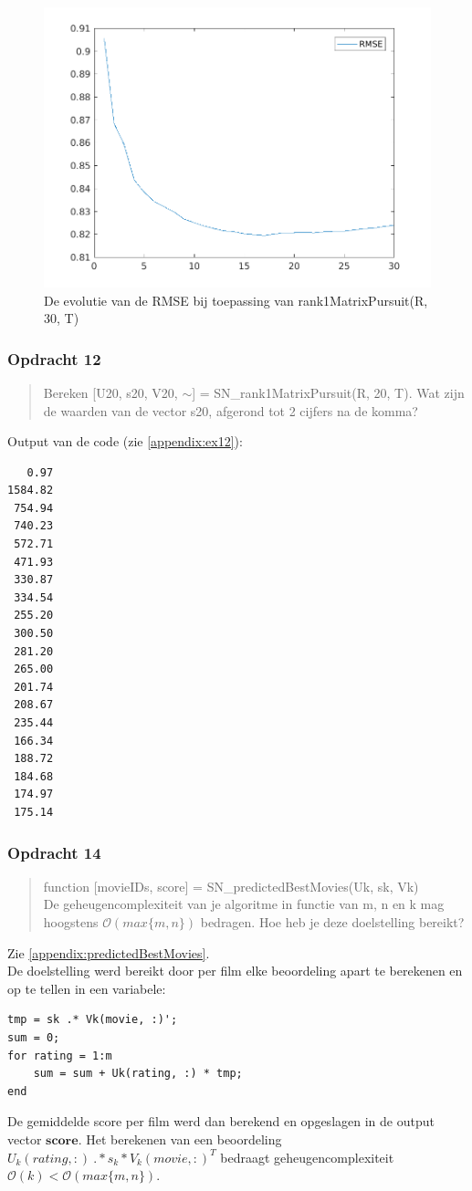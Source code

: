 \documentclass[11pt, a4paper, titlepage, openright]{article}
\begin{document}
    \begin{figure}[H]
        \centering
        \includegraphics[width=0.7\linewidth]{../ex11}
        \caption{De evolutie van de RMSE bij toepassing van rank1MatrixPursuit(R, 30, T)}
        \label{fig:ex2}
    \end{figure}

	\subsubsection{Opdracht 12}
    \begin{quote}
        Bereken [U20, s20, V20, $\sim$] = SN\_rank1MatrixPursuit(R, 20, T). Wat zijn de waarden van de vector s20, afgerond tot 2 cijfers na de komma?
    \end{quote}

	Output van de code (zie \ref{appendix:ex12}):
\begin{lstlisting}
   0.97
1584.82
 754.94
 740.23
 572.71
 471.93
 330.87
 334.54
 255.20
 300.50
 281.20
 265.00
 201.74
 208.67
 235.44
 166.34
 188.72
 184.68
 174.97
 175.14
\end{lstlisting}

	\subsubsection{Opdracht 14}
    \begin{quote}
        function [movieIDs, score] = SN\_predictedBestMovies(Uk, sk, Vk) \\
        De geheugencomplexiteit van je algoritme in functie van m, n en k mag hoogstens \(\mathcal{O}(max\{m, n\})\) bedragen.
        Hoe heb je deze doelstelling bereikt?
    \end{quote}

    Zie \ref{appendix:predictedBestMovies}. \\
    De doelstelling werd bereikt door per film elke beoordeling apart te berekenen en op te tellen in een variabele:
\begin{lstlisting}[style=Matlab-editor, basicstyle = \scriptsize]
tmp = sk .* Vk(movie, :)';
sum = 0;
for rating = 1:m
    sum = sum + Uk(rating, :) * tmp;
end
\end{lstlisting}
    De gemiddelde score per film werd dan berekend en opgeslagen in de output vector \( \boldsymbol{score} \). Het berekenen van een beoordeling
    \( U_k(rating, :) \ .* s_k * V_k(movie, :)^T \) bedraagt geheugencomplexiteit  \(\mathcal{O}(k) < \mathcal{O}(max\{m, n\})\).
\end{document}
